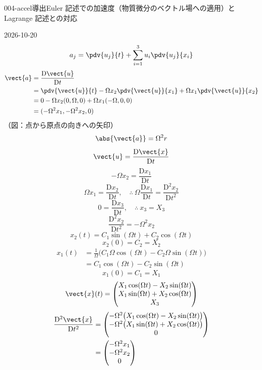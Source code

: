 \documentclass[uplatex,dvipdfmx,a4paper,11pt]{jsarticle}
\begin{document}
\begin{mondai}{004-accel}{導出}{Euler 記述での加速度（物質微分のベクトル場への適用）と Lagrange 記述との対応}
\begin{kotaeutsushi}{2026-10-20}
\[ a_{j}=\pdv{u_{j}}{t}+\sum_{i=1}^{3}u_{i}\pdv{u_{j}}{x_{i}} \]
\begin{align*}
\vect{a}&=\frac{\mathrm{D}\vect{u}}{\mathrm{D}t}\\
&=\pdv{\vect{u}}{t}-\Omega x_{2}\pdv{\vect{u}}{x_{1}}+\Omega x_{1}\pdv{\vect{u}}{x_{2}}\\
&=0-\Omega x_{2}(0,\Omega,0)+\Omega x_{1}(-\Omega,0,0)\\
&=(-\Omega^{2}x_{1},-\Omega^{2}x_{2},0)
\end{align*}
（図：点から原点の向きへの矢印）
\[ \abs{\vect{a}}=\Omega^{2}r \]
\[ \vect{u}=\frac{\mathrm{D}\vect{x}}{\mathrm{D}t} \]
\[ -\Omega x_{2}=\frac{\mathrm{D}x_{1}}{\mathrm{D}t} \]
\[ \Omega x_{1}=\frac{\mathrm{D}x_{2}}{\mathrm{D}t},\quad \therefore\ \Omega\frac{\mathrm{D}x_{1}}{\mathrm{D}t}=\frac{\mathrm{D}^{2}x_{2}}{\mathrm{D}t^{2}} \]
\[ 0=\frac{\mathrm{D}x_{3}}{\mathrm{D}t},\quad \therefore\ x_{3}=X_{3} \]
\[ \frac{\mathrm{D}^{2}x_{2}}{\mathrm{D}t^{2}}=-\Omega^{2}x_{2} \]
\[ x_{2}(t)=C_{1}\sin(\Omega t)+C_{2}\cos(\Omega t) \]
\[ x_{2}(0)=C_{2}=X_{2} \]
\begin{align*}
x_{1}(t)&=\frac{1}{\Omega}\bigl(C_{1}\Omega\cos(\Omega t)-C_{2}\Omega\sin(\Omega t)\bigr)\\
&=C_{1}\cos(\Omega t)-C_{2}\sin(\Omega t)
\end{align*}
\[ x_{1}(0)=C_{1}=X_{1} \]
\[ \vect{x}(t)=\begin{pmatrix}X_{1}\cos(\Omega t)-X_{2}\sin(\Omega t)\\X_{1}\sin(\Omega t)+X_{2}\cos(\Omega t)\\X_{3}\end{pmatrix} \]
\begin{align*}
\frac{\mathrm{D}^{2}\vect{x}}{\mathrm{D}t^{2}}&=\begin{pmatrix}-\Omega^{2}\bigl(X_{1}\cos(\Omega t)-X_{2}\sin(\Omega t)\bigr)\\-\Omega^{2}\bigl(X_{1}\sin(\Omega t)+X_{2}\cos(\Omega t)\bigr)\\0\end{pmatrix}\\
&=\begin{pmatrix}-\Omega^{2}x_{1}\\-\Omega^{2}x_{2}\\0\end{pmatrix}

\end{align*}
\end{kotaeutsushi}
\end{mondai}
\end{document}

